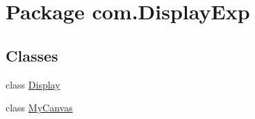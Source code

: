 \hypertarget{namespacecom_1_1_display_exp}{\section{Package com.\-Display\-Exp}
\label{namespacecom_1_1_display_exp}
}
\subsection*{Classes}
\begin{DoxyCompactItemize}
\item 
class \hyperlink{classcom_1_1_display_exp_1_1_display}{Display}
\item 
class \hyperlink{classcom_1_1_display_exp_1_1_my_canvas}{My\-Canvas}
\end{DoxyCompactItemize}

